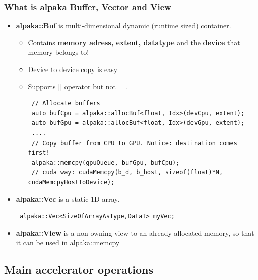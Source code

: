 \documentclass[9pt]{beamer}
\begin{document}
\begin{frame} [fragile]
\frametitle{What is alpaka Buffer, Vector and View}
\begin{itemize}
 \item \textbf{alpaka::Buf} is multi-dimensional dynamic (runtime sized) container.
 \begin{itemize}
 \item Contains \textbf{memory adress, extent, datatype} and the \textbf{device} that memory belongs to!
 \item Device to device copy is easy
 \item Supports [] operator but not [][].
 \lstset{basicstyle=\ttfamily\scriptsize}
 \begin{lstlisting}
 // Allocate buffers
 auto bufCpu = alpaka::allocBuf<float, Idx>(devCpu, extent);
 auto bufGpu = alpaka::allocBuf<float, Idx>(devGpu, extent);
 ....
 // Copy buffer from CPU to GPU. Notice: destination comes first!
 alpaka::memcpy(gpuQueue, bufGpu, bufCpu);
 // cuda way: cudaMemcpy(b_d, b_host, sizeof(float)*N, cudaMemcpyHostToDevice);
 \end{lstlisting}
 \end{itemize}
 \item \textbf{alpaka::Vec} is a static 1D array.
 \begin{lstlisting}
 alpaka::Vec<SizeOfArrayAsType,DataT> myVec;
 \end{lstlisting}
 \item \textbf{alpaka::View} is a non-owning view to an already allocated memory, so that it can be used in alpaka::memcpy
\end{itemize}
    \end{frame}

\subsection{Main accelerator operations}



\end{document}
